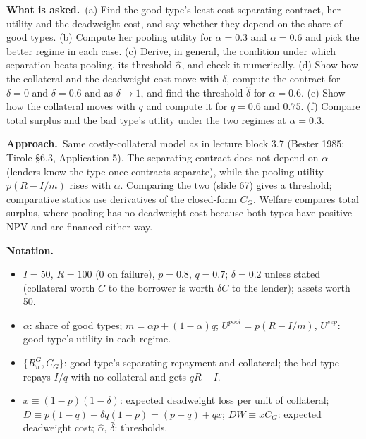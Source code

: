 \documentclass[11pt,a4paper]{article}
\newcommand{\notation}{\par\noindent\textbf{Notation.}}
\newcommand{\asked}{\par\medskip\noindent\textbf{What is asked.}~}
\newcommand{\approach}{\par\smallskip\noindent\textbf{Approach.}~}
\begin{document}
\asked (a) Find the good type's least-cost separating contract, her utility and the deadweight cost, and say whether they depend on the share of good types. (b) Compute her pooling utility for $\alpha=0.3$ and $\alpha=0.6$ and pick the better regime in each case. (c) Derive, in general, the condition under which separation beats pooling, its threshold $\hat\alpha$, and check it numerically. (d) Show how the collateral and the deadweight cost move with $\delta$, compute the contract for $\delta=0$ and $\delta=0.6$ and as $\delta\to1$, and find the threshold $\hat\delta$ for $\alpha=0.6$. (e) Show how the collateral moves with $q$ and compute it for $q=0.6$ and $0.75$. (f) Compare total surplus and the bad type's utility under the two regimes at $\alpha=0.3$.

\approach Same costly-collateral model as in lecture block 3.7 (Bester 1985; Tirole \S6.3, Application 5). The separating contract does not depend on $\alpha$ (lenders know the type once contracts separate), while the pooling utility $p(R-I/m)$ rises with $\alpha$. Comparing the two (slide 67) gives a threshold; comparative statics use derivatives of the closed-form $C_G$. Welfare compares total surplus, where pooling has no deadweight cost because both types have positive NPV and are financed either way.

\notation
\begin{itemize}
  \item $I=50$, $R=100$ (0 on failure), $p=0.8$, $q=0.7$; $\delta=0.2$ unless stated (collateral worth $C$ to the borrower is worth $\delta C$ to the lender); assets worth 50.
  \item $\alpha$: share of good types; $m=\alpha p+(1-\alpha)q$; $U^{pool}=p(R-I/m)$, $U^{sep}$: good type's utility in each regime.
  \item $\{R_u^G,C_G\}$: good type's separating repayment and collateral; the bad type repays $I/q$ with no collateral and gets $qR-I$.
  \item $x\equiv(1-p)(1-\delta)$: expected deadweight loss per unit of collateral; $D\equiv p(1-q)-\delta q(1-p)=(p-q)+qx$; $DW\equiv xC_G$: expected deadweight cost; $\hat\alpha$, $\hat\delta$: thresholds.
\end{itemize}
\end{document}
